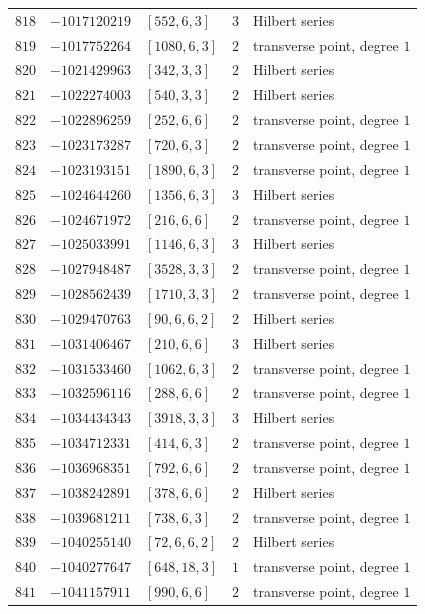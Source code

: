 \documentclass[11pt]{article}
\begin{document}
\begin{center}
\begin{longtable}{r r l c l}
$818$ & $-1017120219$ & $[552,6,3]$ & $3$ & Hilbert series\\
$819$ & $-1017752264$ & $[1080,6,3]$ & $2$ & transverse point, degree $1$\\
$820$ & $-1021429963$ & $[342,3,3]$ & $2$ & Hilbert series\\
$821$ & $-1022274003$ & $[540,3,3]$ & $2$ & Hilbert series\\
$822$ & $-1022896259$ & $[252,6,6]$ & $2$ & transverse point, degree $1$\\
$823$ & $-1023173287$ & $[720,6,3]$ & $2$ & transverse point, degree $1$\\
$824$ & $-1023193151$ & $[1890,6,3]$ & $2$ & transverse point, degree $1$\\
$825$ & $-1024644260$ & $[1356,6,3]$ & $3$ & Hilbert series\\
$826$ & $-1024671972$ & $[216,6,6]$ & $2$ & transverse point, degree $1$\\
$827$ & $-1025033991$ & $[1146,6,3]$ & $3$ & Hilbert series\\
$828$ & $-1027948487$ & $[3528,3,3]$ & $2$ & transverse point, degree $1$\\
$829$ & $-1028562439$ & $[1710,3,3]$ & $2$ & transverse point, degree $1$\\
$830$ & $-1029470763$ & $[90,6,6,2]$ & $2$ & Hilbert series\\
$831$ & $-1031406467$ & $[210,6,6]$ & $3$ & Hilbert series\\
$832$ & $-1031533460$ & $[1062,6,3]$ & $2$ & transverse point, degree $1$\\
$833$ & $-1032596116$ & $[288,6,6]$ & $2$ & transverse point, degree $1$\\
$834$ & $-1034434343$ & $[3918,3,3]$ & $3$ & Hilbert series\\
$835$ & $-1034712331$ & $[414,6,3]$ & $2$ & transverse point, degree $1$\\
$836$ & $-1036968351$ & $[792,6,6]$ & $2$ & transverse point, degree $1$\\
$837$ & $-1038242891$ & $[378,6,6]$ & $2$ & Hilbert series\\
$838$ & $-1039681211$ & $[738,6,3]$ & $2$ & transverse point, degree $1$\\
$839$ & $-1040255140$ & $[72,6,6,2]$ & $2$ & Hilbert series\\
$840$ & $-1040277647$ & $[648,18,3]$ & $1$ & transverse point, degree $1$\\
$841$ & $-1041157911$ & $[990,6,6]$ & $2$ & transverse point, degree $1$\\

\end{longtable}
\end{center}
\end{document}
